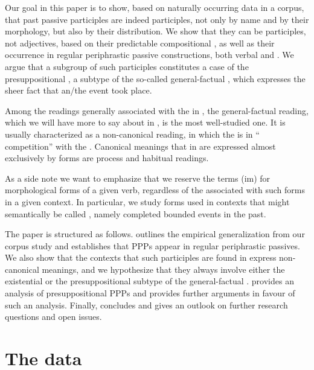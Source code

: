 \documentclass[output=paper,modfonts,newtxmath,hidelinks
\ChapterDOI{10.5281/zenodo.2545513}
]{langscibook}
\begin{document}
Our goal in this paper is to show, based on naturally occurring data in a corpus, that  past passive participles are indeed participles, not only by name and by their morphology, but also by their distribution. We show that they can be participles, not adjectives, based on their predictable compositional , as well as their occurrence in regular periphrastic passive constructions, both verbal and . We argue that a subgroup of such participles constitutes a case of the presuppositional  \citep[in the sense of][]{gronndiss}, a subtype of the so-called general-factual , which expresses the sheer fact that an/the event took place. 

Among the readings generally associated with the  in , the general-factual reading, which we will have more to say about in , is the most well-studied one. It is usually characterized as a non-canonical reading, in which the  is in `` competition'' with the  \citep[a term that goes back to at least][]{mathesius38}. Canonical  meanings that in  are expressed almost exclusively by  forms are process and habitual readings. 

\largerpage[2]
As a side note we want to emphasize that we reserve the terms (im) for morphological forms of a given verb, regardless of the  associated with such forms in a given context. In particular, we study  forms used in contexts that might semantically be called , namely completed bounded events in the past.

The paper is structured as follows.  outlines the empirical generalization from our corpus study and establishes that  PPPs appear in regular periphrastic passives. We also show that the  contexts that such participles are found in express non-canonical  meanings, and we hypothesize that they always involve either the existential or the presuppositional subtype of the general-factual .  provides an analysis of presuppositional  PPPs and provides further arguments in favour of such an analysis. Finally,  concludes and gives an outlook on further research questions and open issues. 

\section{The data}
\label{data}
\end{document}
